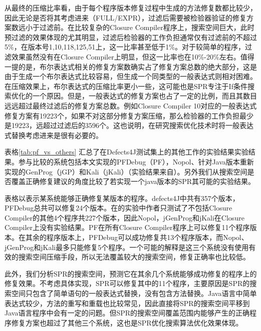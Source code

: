 从最终的压缩比率看，由于每个程序版本修复过程中生成的方法修复数都比较少，因此无论是否将其考虑进来（FULL/EXPR），过滤后需要被检验器验证的修复方案数远小于过滤前。在比较复杂的Closure Compiler程序上，搜索空间巨大，此时预过滤的效果体现的尤其明显，过滤后检验器的工作负担通常仅有过滤前的不超过5\%，在版本号1,10,118,125,51上，这一比率甚至低于1\%。对于较简单的程序，过滤效果虽然没有在Closure Compiler上明显，但这一比率也在10\%-20\%左右。值得一提的是，布尔表达式相关的修复方案数确实占了修复方案总数的绝大部分，这是由于生成一个布尔表达式比较容易，但生成一个同类型的一般表达式则相对困难。在压缩效果上，布尔表达式的压缩比率更小一些，这可能也是SPR专注于If条件搜索优化的一个原因。但是，一般表达式的修复方案也占了一定的比例，而且其数目远远超过最终过滤后的修复方案总数。例如Closure Compiler 10对应的一般表达式修复方案有19223个，如果不对这部分修复方案压缩，那么检验器的工作负担最少是19223，远超过过滤后的3596个。这也说明，在研究搜索优化技术时将一般表达式替换考虑进来是很有必要的。


表格\ref{tab:pf_vs_others}  汇总了在Defects4J测试集上的其他工作的实验结果实验结果。参与比较的系统包括本文实现的PFDebug（PF），Nopol、针对Java版本重新实现的GenProg（jGP）和Kali（jKali）（实验结果来自\cite{Nopol_and_others}）。另外我们从搜索空间是否覆盖正确修复建议的角度比较了若实现一个java版本的SPR其可能的实验结果。

表格以\textbullet 表示某系统能够正确修复某版本的程序。defects4J中共有357个版本，PFDebug总共可以修复24个版本。在\cite{Nopol_and_others}的实验中作者只测试了不包括Closure Compiler的其他4个程序共227个版本，因此Nopol，jGenProg和jKali在Closure Compiler上没有实验结果。PF在所有Closure Compiler程序上可以修复11个程序版本。在其余的程序版本上，PFDebug可以成功修复共13个程序版本，而Nopol、jGenProg和jKali最多只能修复5个程序。一个可能的解释是这三个系统没有使用有效的搜索空间压缩手段，所以无法覆盖较大的搜索空间，修复正确率也比较低。

此外，我们分析SPR的搜索空间，预测它在其余几个系统能够成功修复的程序上的修复效果。不考虑具体实现，SPR可以修复其中的11个程序，主要原因是SPR的搜索空间只包含了简单语句的一般表达式替换，没有包含方法替换。Java语言中简单表达式较少，方法的重写和重载也比较常见，因此直接将SPR的搜索空间平移到Java语言程序中会有一定的问题。但SPR的搜索空间覆盖范围内能够产生的正确程序修复方案也超过了其他三个系统，这也是SPR优化搜索算法优化效果体现。

